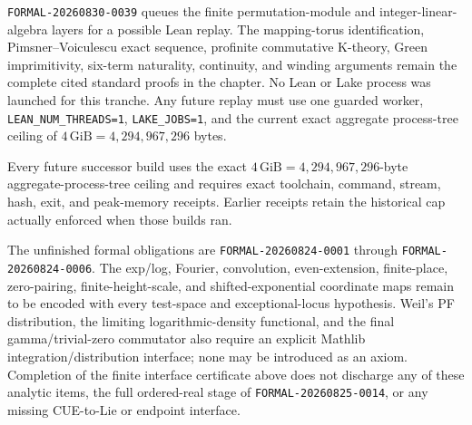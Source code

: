 \texttt{FORMAL-20260830-0039} queues the finite permutation-module and
integer-linear-algebra layers for a possible Lean replay.  The mapping-torus
identification, Pimsner--Voiculescu exact sequence, profinite commutative
K-theory, Green imprimitivity, six-term naturality, continuity, and winding
arguments remain the complete cited standard proofs in the chapter.  No Lean
or Lake process was launched for this tranche.  Any future replay must use one
guarded worker, \texttt{LEAN\_NUM\_THREADS=1}, \texttt{LAKE\_JOBS=1}, and
the current exact aggregate process-tree ceiling of
$4\,\mathrm{GiB}=4{,}294{,}967{,}296$ bytes.

Every future successor build uses the exact
$4\,\mathrm{GiB}=4{,}294{,}967{,}296$-byte aggregate-process-tree ceiling and
requires exact toolchain, command, stream, hash, exit, and peak-memory
receipts.  Earlier receipts retain the historical cap actually enforced when
those builds ran.

The unfinished formal obligations are \texttt{FORMAL-20260824-0001} through
\texttt{FORMAL-20260824-0006}.  The exp/log, Fourier, convolution, even-extension,
finite-place, zero-pairing, finite-height-scale, and shifted-exponential coordinate maps remain
to be encoded with every test-space and exceptional-locus hypothesis.  Weil's PF distribution,
the limiting logarithmic-density functional, and the final gamma/trivial-zero commutator also
require an explicit Mathlib integration/distribution interface; none may be introduced as an
axiom.  Completion of the finite interface certificate above does not discharge any of these
analytic items, the full ordered-real stage of \texttt{FORMAL-20260825-0014}, or any missing
CUE-to-Lie or endpoint interface.
